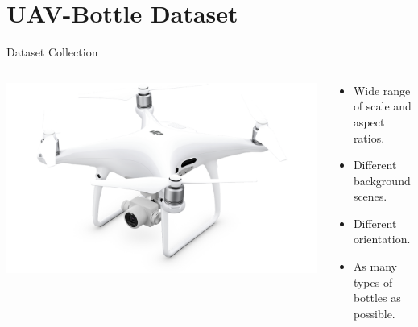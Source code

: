 \documentclass[newPxFont,fullfooter,sectionpages, progressbar]{beamer}
\begin{document}
%
%
\section{UAV-Bottle Dataset}

\begin{frame}{Dataset Collection}
	\vspace{0.4cm}
	\begin{columns}
		\begin{column}{0.48\linewidth}
			\includegraphics[width=\textwidth]{images/DJI_Phantom4.png}
		\end{column}

		\begin{column}{0.48\linewidth}
			\begin{itemize}
				\item<1-> \small{Wide range of scale and aspect ratios.}
				\item<2-> \small{Different background scenes.}
				\item<3-> \small{Different orientation.}
				\item<4-> \small{As many types of bottles as possible.}
			\end{itemize}
		\end{column}
		
	\end{columns}
\end{frame}
\end{document}
